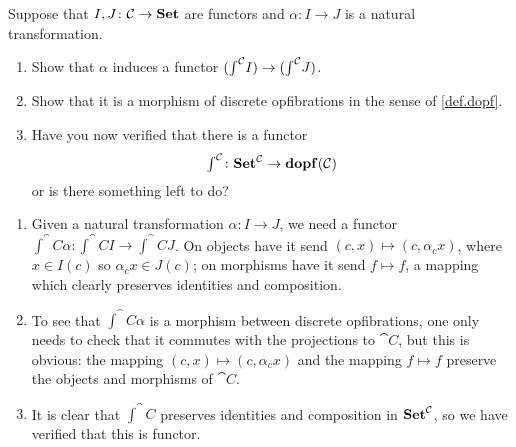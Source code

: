 \documentclass[Book-Poly]{subfiles}
\begin{document}
\begin{exercise}\label{exc.elts_functor}
Suppose that $I,J\colon\mathcal{C}\to\mathbf{Set}$ are functors and $\alpha\colon I\to J$ is a natural transformation.
\begin{enumerate}
	\item Show that $\alpha$ induces a functor $(\textstyle{\int}^{\mathcal{C}}I)\to(\textstyle{\int}^{\mathcal{C}}J)$.
	\item Show that it is a morphism of discrete opfibrations in the sense of \cref{def.dopf}.
	\item Have you now verified that there is a functor
	\[
	\textstyle{\int}^{\mathcal{C}}\colon\mathbf{Set}^{\mathcal{C}}\to\mathbf{dopf}(\mathcal{C})
	\]
	or is there something left to do?
	\end{enumerate}
\begin{solution}
\begin{enumerate}
    \item Given a natural transformation $\alpha\colon I\to J$, we need a functor $\int^\cat{C}\alpha\colon\int^\cat{C}I\to\int^\cat{C}J$. On objects have it send $(c,x)\mapsto(c,\alpha_cx)$, where $x\in I(c)$ so $\alpha_cx\in J(c)$; on morphisms have it send $f\mapsto f$, a mapping which clearly preserves identities and composition.
    \item To see that $\int^\cat{C}\alpha$ is a morphism between discrete opfibrations, one only needs to check that it commutes with the projections to $\cat{C}$, but this is obvious: the mapping $(c,x)\mapsto(c,\alpha_cx)$ and the mapping $f\mapsto f$ preserve the objects and morphisms of $\cat{C}$.
    \item It is clear that $\int^\cat{C}$ preserves identities and composition in $\mathbf{Set}^{\mathcal{C}}$, so we have verified that this is functor.
\end{enumerate}
\end{solution}
\end{exercise}
\end{document}
